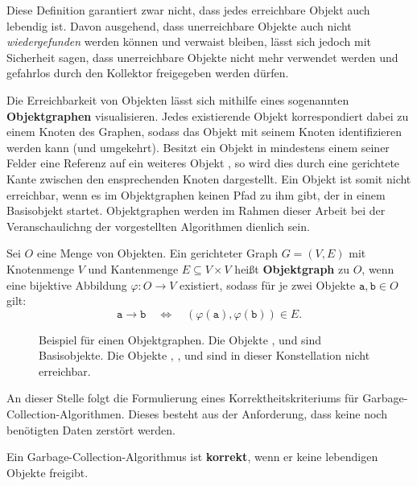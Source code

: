 Diese Definition garantiert zwar nicht, dass jedes erreichbare Objekt auch lebendig ist.
Davon ausgehend, dass unerreichbare Objekte auch nicht \textit{wiedergefunden} werden können und verwaist bleiben, lässt sich jedoch mit Sicherheit sagen, dass unerreichbare Objekte nicht mehr verwendet werden und gefahrlos durch den Kollektor freigegeben werden dürfen.

Die Erreichbarkeit von Objekten lässt sich mithilfe eines sogenannten \textbf{Objektgraphen} visualisieren.
Jedes existierende Objekt korrespondiert dabei zu einem Knoten des Graphen, sodass das Objekt mit seinem Knoten identifizieren werden kann (und umgekehrt).
Besitzt ein Objekt  in mindestens einem seiner Felder eine Referenz auf ein weiteres Objekt , so wird dies durch eine gerichtete Kante zwischen den ensprechenden Knoten dargestellt.
Ein Objekt ist somit nicht erreichbar, wenn es im Objektgraphen keinen Pfad zu ihm gibt, der in einem Basisobjekt startet.
Objektgraphen werden im Rahmen dieser Arbeit bei der Veranschaulichng der vorgestellten Algorithmen dienlich sein.

	
\begin{mybox}
\begin{defn}[Objektgraph]
	Sei $O$ eine Menge von Objekten.
	Ein gerichteter Graph $G = (V,E)$ mit Knotenmenge $V$ und Kantenmenge $E \subseteq V \times V$ heißt \textbf{Objektgraph} zu $O$, wenn eine bijektive Abbildung $\varphi \colon O \rightarrow V$ existiert, sodass für je zwei Objekte $\mathtt{a,b} \in O$ gilt:
	\[
		\mathtt{a} \rightarrow \mathtt{b} \quad \Leftrightarrow \quad (\varphi(\mathtt{a}),\varphi(\mathtt{b})) \in E.
	\]
\end{defn}
\end{mybox}

\begin{figure}[h]
	\centering
	
	\caption[Beispiel für einen Objektgraphen]{Beispiel für einen Objektgraphen. Die Objekte ,  und  sind Basisobjekte. Die Objekte , ,  und  sind in dieser Konstellation nicht erreichbar.}
\end{figure}

An dieser Stelle folgt die Formulierung eines Korrektheitskriteriums für Garbage-Collection-Algorithmen.
Dieses besteht aus der Anforderung, dass keine noch benötigten Daten zerstört werden.

\begin{mybox}
\begin{defn}
	Ein Garbage-Collection-Algorithmus ist \textbf{korrekt}, wenn er keine lebendigen Objekte freigibt.
\end{defn}
\end{mybox}

